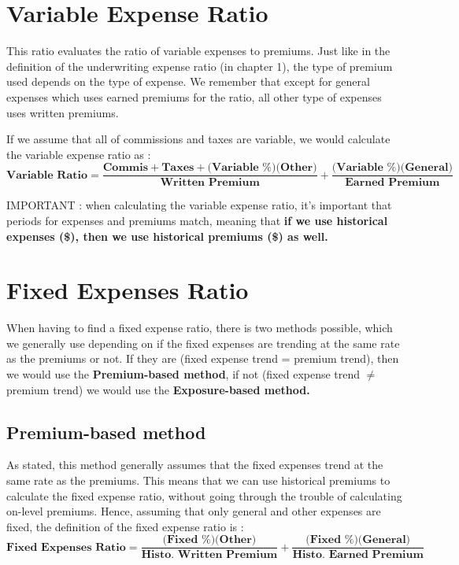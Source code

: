 \documentclass[11pt, english]{memoir}
\numberwithin{definition}{section}
\begin{document}
\section{Variable Expense Ratio}

	This ratio evaluates the ratio of variable expenses to premiums. Just like in the definition of the underwriting expense ratio (in chapter 1), the type of premium used depends on the type of expense. We remember that except for general expenses which uses earned premiums for the ratio, all other type of expenses uses written premiums. 
		
	If we assume that all of commissions and taxes are variable, we would calculate the variable expense ratio as :
	\begin{equation*}
		\textbf{Variable Ratio} = \frac{\textbf{Commis} + \textbf{Taxes} + (\textbf{Variable \% )(Other)}}{\textbf{Written Premium}} +\frac{\textbf{(Variable \%)(General)}}{\textbf{Earned Premium}} 
	\end{equation*}
	
	IMPORTANT : when calculating the variable expense ratio, it's important that periods for expenses and premiums match, meaning that \textbf{if we use historical expenses (\$), then we use historical premiums (\$) as well.}
	
	
\section{Fixed Expenses Ratio}
	When having to find a fixed expense ratio, there is two methods possible, which we generally use depending on if the fixed expenses are trending at the same rate as the premiums or not. If they are (fixed expense trend = premium trend), then we would use the \textbf{Premium-based method}, if not (fixed expense trend $ \neq $ premium trend) we would use the \textbf{Exposure-based method.}
	
	\subsection{Premium-based method}
		As stated, this method generally assumes that the fixed expenses trend at the same rate as the premiums. This means that we can use historical premiums to calculate the fixed expense ratio, without going through the trouble of calculating on-level premiums. Hence, assuming that only general and other expenses are fixed, the definition of the fixed expense ratio is :
		\begin{equation*}
		\textbf{Fixed Expenses Ratio} = \frac{(\textbf{Fixed \% )(Other)}}{\textbf{Histo. Written Premium}} +\frac{\textbf{(Fixed \%)(General)}}{\textbf{Histo. Earned Premium}} 
		\end{equation*}
	
\end{document}
